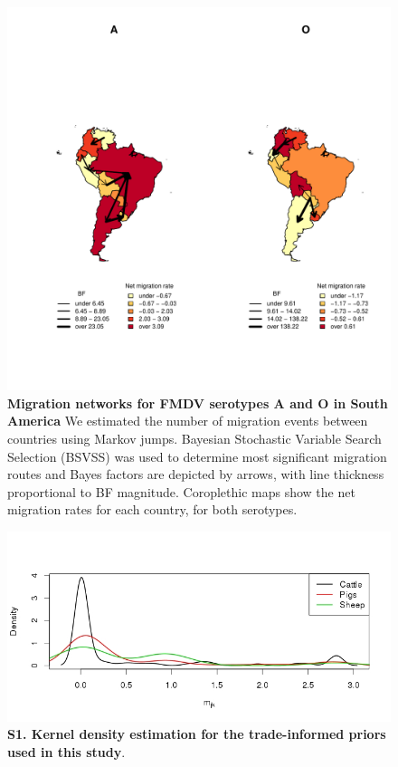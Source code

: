\documentclass[10pt]{article}
\begin{document}
\begin{figure}[!ht]
\begin{center}
\includegraphics[scale=.85]{FIGURES/compound.pdf}
\end{center}
\caption{
{\bf Migration networks for FMDV serotypes A and O in South America} We estimated the number of migration events between countries using Markov jumps.  Bayesian Stochastic Variable Search Selection (BSVSS) was used to determine most significant migration routes and Bayes factors are depicted by arrows, with line thickness proportional to BF magnitude. Coroplethic maps show the net migration rates for each country, for both serotypes.\\
}
\label{fig:mj&BFs}
\end{figure}

\newpage
\begin{figure}[!ht]
\begin{center}
\includegraphics[scale=.5]{FIGURES/trade_info.jpeg}
\end{center}
\caption*{
{\bf S1. Kernel density estimation for the trade-informed priors used in this study}.\\
}

\label{sfig:tradeinfo}
\end{figure}
\end{document}
